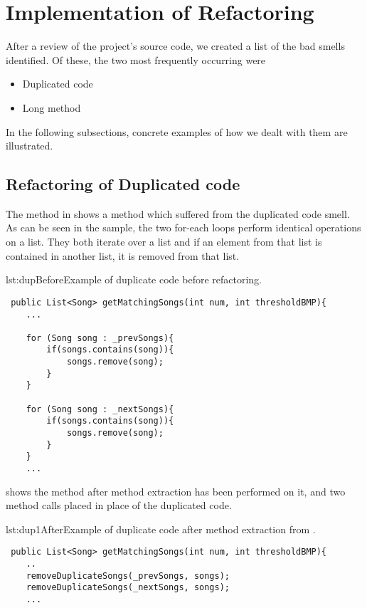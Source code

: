 \section{Implementation of Refactoring}
After a review of the project's source code, we created a list of the bad smells identified. Of these, the two most frequently occurring were
\begin{itemize}
\item Duplicated code
\item Long method
\end{itemize}

In the following subsections, concrete examples of how we dealt with them are illustrated. 
\subsection{Refactoring of Duplicated code}
The method in  shows a method which suffered from the duplicated code smell. As can be seen in the sample, the two for-each loops perform identical operations on a list. They both iterate over a list and if an element from that list is contained in another list, it is removed from that list.

\begin{code}{lst:dupBefore}{Example of duplicate code before refactoring.}
\begin{lstlisting}
 public List<Song> getMatchingSongs(int num, int thresholdBMP){
    ...

    for (Song song : _prevSongs){
        if(songs.contains(song)){
            songs.remove(song);
        }
    }

    for (Song song : _nextSongs){
        if(songs.contains(song)){
            songs.remove(song);
        }
    }
    ...
\end{lstlisting}
\end{code}

 shows the method after method extraction has been performed on it, and two method calls placed in place of the duplicated code.

\begin{code}{lst:dup1After}{Example of duplicate code after method extraction from .}
\begin{lstlisting}
 public List<Song> getMatchingSongs(int num, int thresholdBMP){
    ..
    removeDuplicateSongs(_prevSongs, songs);
    removeDuplicateSongs(_nextSongs, songs);
    ...
\end{lstlisting}
\end{code}

